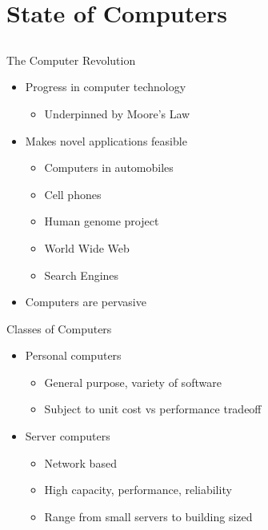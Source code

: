 \documentclass{beamer}
\begin{document}
\section{State of Computers}
\subsection{}
\begin{frame}{The Computer Revolution}
\begin{itemize}
\item Progress in computer technology
\begin{itemize}
\item Underpinned by Moore's Law 
\end{itemize}
\item Makes novel applications feasible
\begin{itemize}
\item Computers in automobiles
\item Cell phones
\item Human genome project
\item World Wide Web
\item Search Engines
\end{itemize}
\item Computers are pervasive
\end{itemize}
\end{frame}

\begin{frame}{Classes of Computers}
\begin{itemize}
\item Personal computers
\begin{itemize}
\item General purpose, variety of software
\item Subject to unit cost vs performance tradeoff
\end{itemize}
\item Server computers
\begin{itemize}
\item Network based
\item High capacity, performance, reliability
\item Range from small servers to building sized
\end{itemize}
\end{itemize}
\end{frame}
\end{document}
